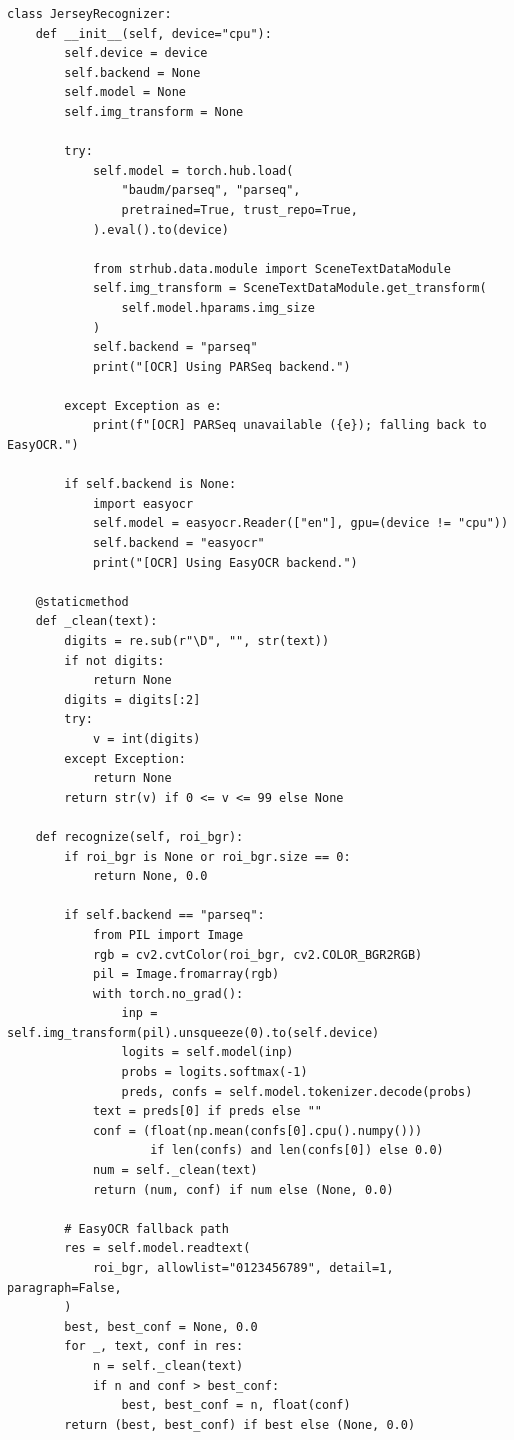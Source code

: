 \begin{lstlisting}[caption={\texttt{JerseyRecognizer} --- attempts to load PARSeq at start-up and falls back to EasyOCR if unavailable (Section~\ref{sec:models}). This is the exact fallback mechanism illustrated in Figure~\ref{fig:video-step6-ocr}.}]
class JerseyRecognizer:
    def __init__(self, device="cpu"):
        self.device = device
        self.backend = None
        self.model = None
        self.img_transform = None

        try:
            self.model = torch.hub.load(
                "baudm/parseq", "parseq",
                pretrained=True, trust_repo=True,
            ).eval().to(device)

            from strhub.data.module import SceneTextDataModule
            self.img_transform = SceneTextDataModule.get_transform(
                self.model.hparams.img_size
            )
            self.backend = "parseq"
            print("[OCR] Using PARSeq backend.")

        except Exception as e:
            print(f"[OCR] PARSeq unavailable ({e}); falling back to EasyOCR.")

        if self.backend is None:
            import easyocr
            self.model = easyocr.Reader(["en"], gpu=(device != "cpu"))
            self.backend = "easyocr"
            print("[OCR] Using EasyOCR backend.")

    @staticmethod
    def _clean(text):
        digits = re.sub(r"\D", "", str(text))
        if not digits:
            return None
        digits = digits[:2]
        try:
            v = int(digits)
        except Exception:
            return None
        return str(v) if 0 <= v <= 99 else None

    def recognize(self, roi_bgr):
        if roi_bgr is None or roi_bgr.size == 0:
            return None, 0.0

        if self.backend == "parseq":
            from PIL import Image
            rgb = cv2.cvtColor(roi_bgr, cv2.COLOR_BGR2RGB)
            pil = Image.fromarray(rgb)
            with torch.no_grad():
                inp = self.img_transform(pil).unsqueeze(0).to(self.device)
                logits = self.model(inp)
                probs = logits.softmax(-1)
                preds, confs = self.model.tokenizer.decode(probs)
            text = preds[0] if preds else ""
            conf = (float(np.mean(confs[0].cpu().numpy()))
                    if len(confs) and len(confs[0]) else 0.0)
            num = self._clean(text)
            return (num, conf) if num else (None, 0.0)

        # EasyOCR fallback path
        res = self.model.readtext(
            roi_bgr, allowlist="0123456789", detail=1, paragraph=False,
        )
        best, best_conf = None, 0.0
        for _, text, conf in res:
            n = self._clean(text)
            if n and conf > best_conf:
                best, best_conf = n, float(conf)
        return (best, best_conf) if best else (None, 0.0)
\end{lstlisting}

